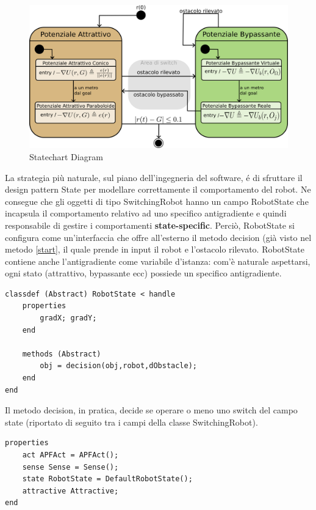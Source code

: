 \documentclass[14pt,a4paper]{extarticle}
\begin{document}
\begin{figure}[H]
\caption{Statechart Diagram} \label{state}
\includegraphics[width=\textwidth]{statechart.png}
\end{figure}

La strategia più naturale, sul piano dell'ingegneria del software, é di sfruttare il design pattern State per modellare correttamente il comportamento del robot. Ne consegue che gli oggetti di tipo SwitchingRobot hanno un campo RobotState che incapsula il comportamento relativo ad uno specifico antigradiente e quindi responsabile di gestire i comportamenti \textbf{state-specific}. Perciò, RobotState si configura come un'interfaccia che offre all'esterno il metodo decision (già visto nel metodo \ref{start}, il quale prende in input il robot e l'ostacolo rilevato. RobotState contiene anche l'antigradiente come variabile d'istanza: com'è naturale aspettarsi, ogni stato (attrattivo, bypassante ecc) possiede un specifico antigradiente. 
\begin{lstlisting}[caption=Classe asratta RobotState]
classdef (Abstract) RobotState < handle
    properties
        gradX; gradY;
    end
    
    methods (Abstract)
        obj = decision(obj,robot,dObstacle);
    end
end
\end{lstlisting}
Il metodo decision, in pratica, decide se operare o meno uno switch del campo state (riportato di seguito tra i campi della classe SwitchingRobot).
\begin{lstlisting}[caption=Campi della classe SwitchingRobot]
properties
	act APFAct = APFAct();
	sense Sense = Sense();
	state RobotState = DefaultRobotState();
	attractive Attractive;
end
\end{lstlisting}
\end{document}
